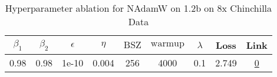 \begin{table}[H]
\centering
\caption{Hyperparameter ablation for NAdamW on 1.2b on 8x Chinchilla Data}
\label{tab:ablation_nadamw_1.2b_8}
\begin{tabular}{ccccccccc}
\toprule
$\beta_1$ & $\beta_2$ & $\epsilon$ & $\eta$ & $\mathrm{BSZ}$ & $\mathrm{warmup}$ & $\lambda$ & Loss & Link \\
\midrule
0.98 & 0.98 & 1e-10 & 0.004 & 256 & 4000 & 0.1 & 2.749 & \href{https://wandb.ai/stanford-mercury/optimizer-scaling/runs/sweep-1.2b-193B-nadamwa486b9lr0.004-wd0.1-minlr0.0-warmup4000-b1-563e6e}{0} \\
\midrule
\bottomrule
\end{tabular}
\end{table}

